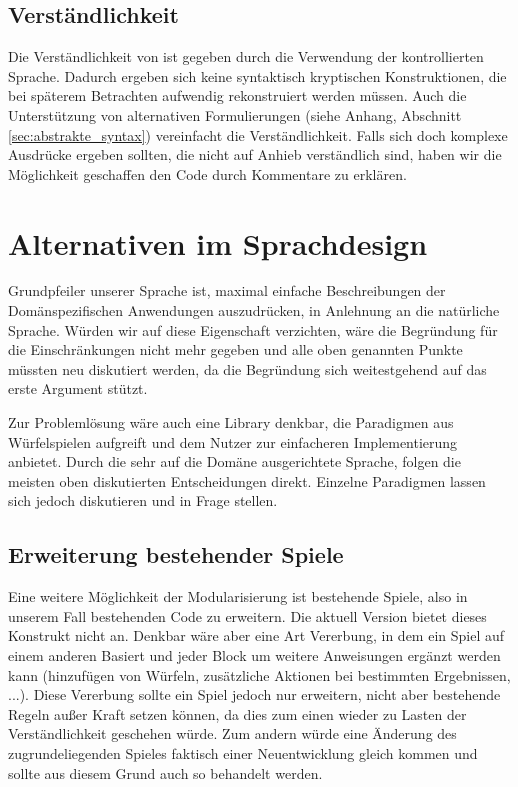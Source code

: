 \subsection{Verständlichkeit} %
\label{sub:verstandlichkeit}
	Die Verständlichkeit von \dg ist gegeben durch die Verwendung der kontrollierten Sprache. Dadurch ergeben sich keine syntaktisch kryptischen Konstruktionen, die bei späterem Betrachten aufwendig rekonstruiert werden müssen. Auch die Unterstützung von alternativen Formulierungen (siehe Anhang, Abschnitt \ref{sec:abstrakte_syntax}) vereinfacht die Verständlichkeit. Falls sich doch komplexe Ausdrücke ergeben sollten, die nicht auf Anhieb verständlich sind, haben wir die Möglichkeit geschaffen den Code durch Kommentare zu erklären.


\section{Alternativen im Sprachdesign} %
\label{sec:alternativen_im_sprachdesign} 

Grundpfeiler unserer Sprache ist, maximal einfache Beschreibungen der Domänspezifischen Anwendungen auszudrücken, in Anlehnung an die natürliche Sprache. Würden wir auf diese Eigenschaft verzichten, wäre die Begründung für die Einschränkungen nicht mehr gegeben und alle oben genannten Punkte müssten neu diskutiert werden, da die Begründung sich weitestgehend auf das erste Argument stützt. 

Zur Problemlösung wäre auch eine Library denkbar, die Paradigmen aus Würfelspielen aufgreift und dem Nutzer zur einfacheren Implementierung anbietet. Durch die sehr auf die Domäne ausgerichtete Sprache, folgen die meisten oben diskutierten Entscheidungen direkt. Einzelne Paradigmen lassen sich jedoch diskutieren und in Frage stellen.

\subsection{Erweiterung bestehender Spiele}
\label{sub:erweiterung_bestehender_spiele}
	Eine weitere Möglichkeit der Modularisierung ist bestehende Spiele, also in unserem Fall bestehenden Code zu erweitern. Die aktuell \dg Version bietet dieses Konstrukt nicht an. Denkbar wäre aber eine Art Vererbung, in dem ein Spiel auf einem anderen Basiert und jeder Block um weitere Anweisungen ergänzt werden kann (hinzufügen von Würfeln, zusätzliche Aktionen bei bestimmten Ergebnissen, ...). Diese Vererbung sollte ein Spiel jedoch nur erweitern, nicht aber bestehende Regeln außer Kraft setzen können, da dies zum einen wieder zu Lasten der Verständlichkeit geschehen würde. Zum andern würde eine Änderung des zugrundeliegenden Spieles faktisch einer Neuentwicklung gleich kommen und sollte aus diesem Grund auch so behandelt werden.

